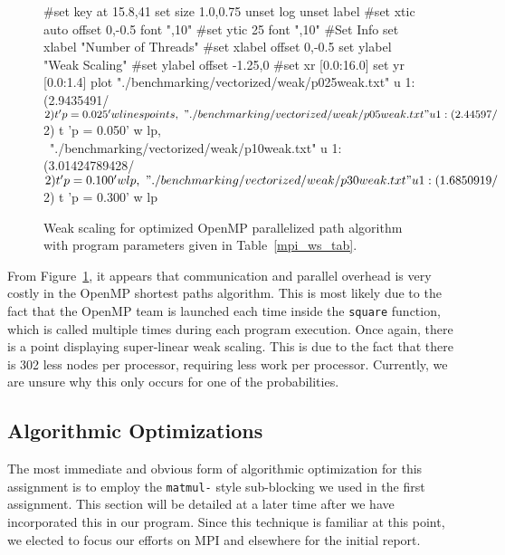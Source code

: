 \documentclass[11pt]{article}
\begin{document}
\begin{figure}[h!]
	\begin{center}
		\begin{gnuplot}[terminal=cairolatex, terminaloptions= color] 
			#set key at 15.8,41
			set size 1.0,0.75              
			unset log                          
			unset label                          
			#set xtic auto offset 0,-0.5 font ",10"                     
			#set ytic 25 font ",10" 
			#Set Info
			set xlabel "Number of Threads"
			#set xlabel offset 0,-0.5
			set ylabel "Weak Scaling"
			#set ylabel offset -1.25,0
			#set xr [0.0:16.0]
			set yr [0.0:1.4]
			plot "./benchmarking/vectorized/weak/p025weak.txt" u 1:(2.9435491/$2) t 'p = 0.025' w linespoints, \
			"./benchmarking/vectorized/weak/p05weak.txt" u 1:(2.44597/$2) t 'p = 0.050' w lp, \
			"./benchmarking/vectorized/weak/p10weak.txt" u 1:(3.01424789428/$2) t 'p = 0.100' w lp, \
			"./benchmarking/vectorized/weak/p30weak.txt" u 1:(1.6850919/$2) t 'p = 0.300' w lp
		\end{gnuplot}
		\caption{Weak scaling for optimized OpenMP parallelized path algorithm with program parameters given in Table~\ref{mpi_ws_tab}.}
		\label{omp_ws}
	\end{center}
\end{figure}
From Figure~\ref{omp_ws}, it appears that communication and parallel overhead is very costly in the OpenMP shortest paths algorithm. This is most likely due to the fact that the OpenMP team is launched each time inside the \texttt{square} function, which is called multiple times during each program execution. Once again, there is a point displaying super-linear weak scaling. This is due to the fact that there is 302 less nodes per processor, requiring less work per processor. Currently, we are unsure why this only occurs for one of the probabilities. 

\subsection{Algorithmic Optimizations}

\noindent The most immediate and obvious form of algorithmic optimization for this assignment is to employ the \texttt{matmul-} style sub-blocking we used in the first assignment.  This section will be detailed at a later time after we have incorporated this in our program.  Since this technique is familiar at this point, we elected to focus our efforts on MPI and elsewhere for the initial report.\\
\end{document}
